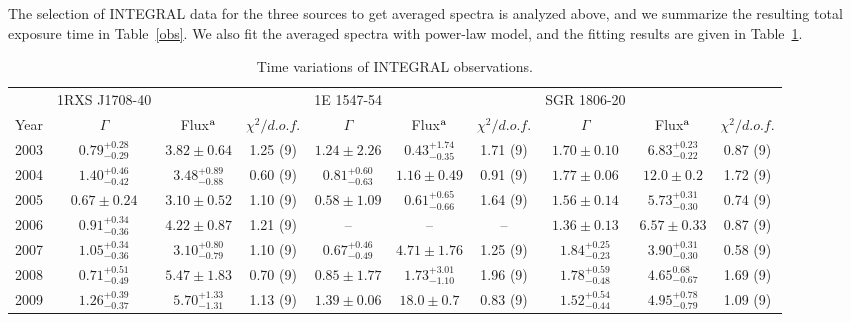 \documentclass[]{raa}
\begin{document}
%
The selection of INTEGRAL data for the three sources to get averaged spectra is analyzed above, and we summarize the resulting total exposure time in Table~\ref{obs}.
% 
We also fit the averaged spectra with power-law model, and the fitting results are given in Table~\ref{tvar}.


\begin{table}
\bc
\begin{minipage}[]{100mm}
\caption[]{{Time variations of INTEGRAL observations.} \label{tvar}}
\end{minipage}
\setlength{\tabcolsep}{3pt}
 \begin{tabular}{cccccccccc}
  \hline \hline \noalign{\smallskip}
 & 1RXS J1708-40 & & & 1E 1547-54 & & & SGR 1806-20 & & \\
Year & $\Gamma$ & Flux$^{\rm a}$ & $\chi^2/d.o.f.$ & $\Gamma$ & Flux$^{\rm a}$ & $\chi^2/d.o.f.$ & $\Gamma$ & Flux$^{\rm a}$ & $\chi^2/d.o.f.$  \\
  \hline\noalign{\smallskip}  
2003 &  $0.79_{-0.29}^{+0.28}$ & $3.82 \pm 0.64$  & 1.25 (9) & $1.24 \pm 2.26$  & $0.43_{-0.35}^{+1.74}$  & 1.71 (9) & $1.70 \pm 0.10$ & $6.83_{-0.22}^{+0.23}$  & 0.87 (9)  \\
2004 & $1.40_{-0.42}^{+0.46}$ & $3.48_{-0.88}^{+0.89}$ & 0.60 (9) & $0.81_{-0.63}^{+0.60}$ & $1.16 \pm 0.49$ & 0.91 (9) & $1.77 \pm 0.06$ & $12.0 \pm 0.2$ & 1.72 (9) \\
2005& $0.67 \pm 0.24$ &  $3.10 \pm 0.52$ & 1.10 (9) & $0.58 \pm 1.09$ & $0.61_{-0.66}^{+0.65}$ & 1.64 (9) & $1.56 \pm 0.14$ & $5.73_{-0.30}^{+0.31}$ & 0.74 (9) \\
2006 & $0.91_{-0.36}^{+0.34}$ & $4.22 \pm 0.87$ & 1.21 (9) & -- & -- & -- & $1.36 \pm 0.13$ & $6.57 \pm 0.33$ & 0.87 (9)\\
2007 & $1.05_{-0.36}^{+0.34}$ & $3.10_{-0.79}^{+0.80}$ & 1.10 (9) & $0.67_{-0.49}^{+0.46}$ & $4.71 \pm 1.76$ & 1.25 (9) & $1.84_{-0.23}^{+0.25}$ & $3.90_{-0.30}^{+0.31}$ & 0.58 (9) \\
2008 & $0.71_{-0.49}^{+0.51}$ & $5.47 \pm 1.83$ & 0.70 (9) & $0.85 \pm 1.77$ & $1.73_{-1.10}^{+3.01}$ & 1.96 (9) & $1.78_{-0.48}^{+0.59}$ & $4.65_{-0.67}^{0.68}$ & 1.69 (9) \\
2009 & $1.26_{-0.37}^{+0.39}$ & $5.70_{-1.31}^{+1.33}$ & 1.13 (9) & $1.39 \pm 0.06$ & $18.0 \pm 0.7$ & 0.83 (9) & $1.52_{-0.44}^{+0.54}$ & $4.95_{-0.79}^{+0.78}$ & 1.09 (9) \\

\end{tabular}
\end{table}
\end{document}
